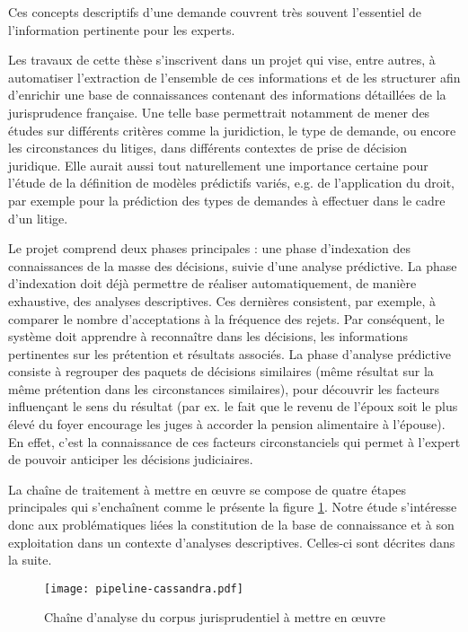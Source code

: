 Ces concepts descriptifs d'une demande couvrent très souvent l'essentiel de l'information pertinente pour les experts. 

Les travaux de cette thèse s'inscrivent dans un projet qui vise, entre autres, à automatiser l'extraction de l'ensemble de ces informations et de les structurer afin d'enrichir une base de connaissances contenant des informations détaillées de la jurisprudence française. Une telle base permettrait notamment de mener des études sur différents critères comme la juridiction, le type de demande, ou encore les circonstances du litiges, dans différents contextes de prise de décision juridique. Elle aurait aussi tout naturellement une importance certaine pour l'étude  de la définition de modèles prédictifs variés, e.g. de l'application du droit, par exemple pour la prédiction des types de demandes à effectuer dans le cadre d'un litige. 

Le projet comprend deux phases principales : une phase d'indexation des connaissances de la masse des décisions, suivie d'une analyse prédictive. La phase d'indexation doit déjà permettre de réaliser automatiquement, de manière exhaustive, des analyses descriptives. Ces dernières consistent, par exemple, à comparer le nombre d'acceptations à la fréquence des rejets. Par conséquent, le système doit apprendre à reconnaître dans les décisions, les informations pertinentes sur les prétention et résultats associés. La phase d'analyse prédictive consiste à regrouper des paquets de décisions similaires (même résultat sur la même prétention dans les circonstances similaires), pour découvrir les facteurs influençant le sens du résultat (par ex. le fait que \og le revenu de l'époux soit le plus élevé du foyer\fg{} encourage les juges à accorder la pension alimentaire à l'épouse). En effet, c'est la connaissance de ces facteurs circonstanciels qui permet à l'expert de pouvoir anticiper les décisions judiciaires.

 La chaîne de traitement à mettre en \oe uvre se compose de quatre étapes principales qui s'enchaînent comme le présente la figure \ref{fig:intro:pipeline-globale}. Notre étude s'intéresse donc aux problématiques liées la constitution de la base de connaissance et à son exploitation dans un contexte d'analyses descriptives. Celles-ci sont décrites dans la suite.
\begin{figure}
	\texttt{[image: pipeline-cassandra.pdf]}
	\caption{Chaîne d'analyse du corpus jurisprudentiel à mettre en \oe uvre} \label{fig:intro:pipeline-globale}
\end{figure} 


